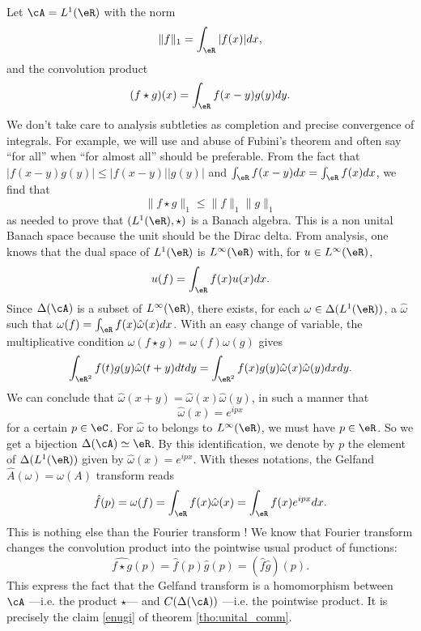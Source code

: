 Let $\cA=L^1(\eR)$ with the norm
\[
  \|f\|_1=\int_{\eR}|f(x)|dx,
\]
and the convolution product
\[
   (f\star g)(x)=\int_{\eR}f(x-y)g(y)dy.
\]
We don't take care to analysis subtleties as completion and precise convergence of integrals. For example, we will use and abuse of Fubini's theorem and often say ``for all'' when ``for almost all'' should be preferable. From the fact that $|f(x-y)g(y)|\leq|f(x-y)||g(y)|$ and $\int_{\eR}f(x-y)dx=\int_{\eR}f(x)dx$, we find that 
\[
   \|f\star g\|_1\leq \|f\|_1\|g\|_1
\]
as needed to prove that $(L^1(\eR),\star)$ is a Banach algebra. This is a non unital Banach space because the unit should be the Dirac delta. From analysis, one knows that the dual space of $L^1(\eR)$ is $L^{\infty}(\eR)$ with, for $u\in L^{\infty}(\eR)$,
\[
  u(f)=\int_{\eR}f(x)u(x)dx.
\]
Since $\Delta(\cA)$ is a subset of $L^{\infty}(\eR)$, there exists, for each $\omega\in\Delta(L^1(\eR))$, a $\hat{\omega}$ such that $\omega(f)=\int_{\eR}f(x)\hat{\omega}(x)dx$. With an easy change of variable, the multiplicative condition $\omega(f\star g)=\omega(f)\omega(g)$ gives
\[ 
\int_{\eR^2}f(t)g(y)\hat{\omega}(t+y)dtdy=\int_{\eR^2}f(x)g(y)\hat{\omega}(x)\hat{\omega}(y)dxdy.
\]
We can conclude that $\hat{\omega}(x+y)=\hat{\omega}(x)\hat{\omega}(y)$, in such a manner that
\[ 
\hat{\omega}(x)=e^{ipx}
\]
for a certain $p\in\eC$. For $\hat{\omega}$ to belongs to $L^{\infty}(\eR)$, we must have $p\in\eR$. So we get a bijection $\Delta(\cA)\simeq\eR$. By this identification, we denote by $p$ the element of $\Delta(L^1(\eR))$ given by $\hat{\omega}(x)=e^{ipx}$. With theses notations, the Gelfand $\hat A(\omega)=\omega(A)$ transform reads
\begin{equation}
  \hat f(p)=\omega(f)=\int_{\eR}f(x)\hat{\omega}(x)
                     =\int_{\eR}f(x)e^{ipx}dx.
\end{equation}
This is nothing else than the Fourier transform ! We know that Fourier transform changes the convolution product into the pointwise usual product of functions:
\[ 
\widehat{f\star g}(p)=\hat f(p)\hat g(p)=(\hat f\hat g)(p).
\]
This express the fact that the Gelfand transform is a homomorphism between $\cA$ ---i.e. the product $\star$--- and $C(\Delta(\cA))$ ---i.e. the pointwise product. It is precisely the claim \ref{enugi} of theorem  \ref{tho:unital_comm}. 


